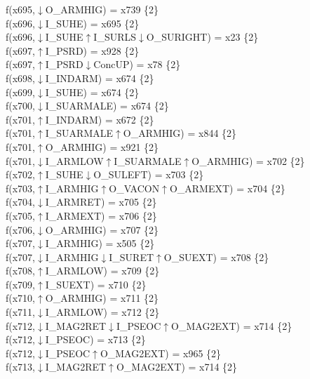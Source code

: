 f(x695,$\downarrow$O\_ARMHIG) = x739 \{2\} \\  
f(x696,$\downarrow$I\_SUHE) = x695 \{2\} \\  
f(x696,$\downarrow$I\_SUHE$\uparrow$I\_SURLS$\downarrow$O\_SURIGHT) = x23 \{2\} \\  
f(x697,$\uparrow$I\_PSRD) = x928 \{2\} \\  
f(x697,$\uparrow$I\_PSRD$\downarrow$ConcUP) = x78 \{2\} \\  
f(x698,$\downarrow$I\_INDARM) = x674 \{2\} \\  
f(x699,$\downarrow$I\_SUHE) = x674 \{2\} \\  
f(x700,$\downarrow$I\_SUARMALE) = x674 \{2\} \\  
f(x701,$\uparrow$I\_INDARM) = x672 \{2\} \\  
f(x701,$\uparrow$I\_SUARMALE$\uparrow$O\_ARMHIG) = x844 \{2\} \\  
f(x701,$\uparrow$O\_ARMHIG) = x921 \{2\} \\  
f(x701,$\downarrow$I\_ARMLOW$\uparrow$I\_SUARMALE$\uparrow$O\_ARMHIG) = x702 \{2\} \\  
f(x702,$\uparrow$I\_SUHE$\downarrow$O\_SULEFT) = x703 \{2\} \\  
f(x703,$\uparrow$I\_ARMHIG$\uparrow$O\_VACON$\uparrow$O\_ARMEXT) = x704 \{2\} \\  
f(x704,$\downarrow$I\_ARMRET) = x705 \{2\} \\  
f(x705,$\uparrow$I\_ARMEXT) = x706 \{2\} \\  
f(x706,$\downarrow$O\_ARMHIG) = x707 \{2\} \\  
f(x707,$\downarrow$I\_ARMHIG) = x505 \{2\} \\  
f(x707,$\downarrow$I\_ARMHIG$\downarrow$I\_SURET$\uparrow$O\_SUEXT) = x708 \{2\} \\  
f(x708,$\uparrow$I\_ARMLOW) = x709 \{2\} \\  
f(x709,$\uparrow$I\_SUEXT) = x710 \{2\} \\  
f(x710,$\uparrow$O\_ARMHIG) = x711 \{2\} \\  
f(x711,$\downarrow$I\_ARMLOW) = x712 \{2\} \\  
f(x712,$\downarrow$I\_MAG2RET$\downarrow$I\_PSEOC$\uparrow$O\_MAG2EXT) = x714 \{2\} \\  
f(x712,$\downarrow$I\_PSEOC) = x713 \{2\} \\  
f(x712,$\downarrow$I\_PSEOC$\uparrow$O\_MAG2EXT) = x965 \{2\} \\  
f(x713,$\downarrow$I\_MAG2RET$\uparrow$O\_MAG2EXT) = x714 \{2\} \\  
